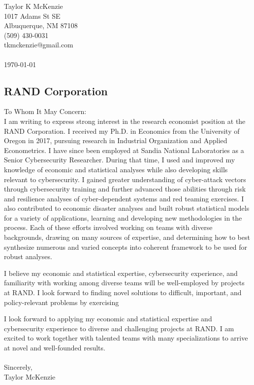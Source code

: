 \documentclass[]{article}
\begin{document}
\thispagestyle{empty}

\noindent Taylor K McKenzie\\1017 Adams St SE\\ Albuquerque, NM 87108\\ (509) 430-0031\\ tkmckenzie@gmail.com\\ \\
\today

\subsection*{RAND Corporation}

To Whom It May Concern: \\

I am writing to express strong interest in the research economist position at the RAND Corporation. I received my Ph.D. in Economics from the University of Oregon in 2017, pursuing research in Industrial Organization and Applied Econometrics. I have since been employed at Sandia National Laboratories as a Senior Cybersecurity Researcher. During that time, I used and improved my knowledge of economic and statistical analyses while also developing skills relevant to cybersecurity. I gained greater understanding of cyber-attack vectors through cybersecurity training and further advanced those abilities through risk and resilience analyses of cyber-dependent systems and red teaming exercises. I also contributed to economic disaster analyses and built robust statistical models for a variety of applications, learning and developing new methodologies in the process. Each of these efforts involved working on teams with diverse backgrounds, drawing on many sources of expertise, and determining how to best synthesize numerous and varied concepts into coherent framework to be used for robust analyses.

I believe my economic and statistical expertise, cybersecurity experience, and familiarity with working among diverse teams will be well-employed by projects at RAND. I look forward to finding novel solutions to difficult, important, and policy-relevant problems by exercising 

I look forward to applying my economic and statistical expertise and cybersecurity experience to diverse and challenging projects at RAND. I am excited to work together with talented teams with many specializations to arrive at novel and well-founded results.\\\\

\noindent Sincerely,\\

\noindent Taylor McKenzie
\end{document}
